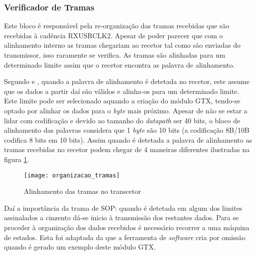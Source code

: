 \subsubsection*{Verificador de Tramas} \label{subsub:serial_frameChecker}
  

Este bloco é responsável pela re-organização das tramas recebidas que são recebidas à cadência RXUSRCLK2. Apesar de poder parecer que com o alinhamento interno as tramas chegariam ao recetor tal como são enviadas do transmissor, isso raramente se verifica. As tramas são alinhadas para um determinado limite assim que o recetor encontra as palavra de alinhamento. %

Segundo \cite{R022} e \cite{R011}, quando a palavra de alinhamento é detetada no recetor, este assume que os dados a partir daí são válidos e alinha-os para um determinado limite. Este limite pode ser selecionado aquando a criação do módulo GTX, tendo-se optado por alinhar os dados para o \textit{byte} mais próximo. Apesar de não se estar a lidar com codificação e devido ao tamanho do \textit{datapath} ser 40 bits, o bloco de alinhamento das palavras considera que 1 \textit{byte} são 10 bits (a codificação 8B/10B codifica 8 bits em 10 bits). Assim quando é detetada a palavra de alinhamento as tramas recebidas no recetor podem chegar de 4 maneiras diferentes ilustradas na figura \ref{fig:alinhamento_tramas_gtx}.


\begin{figure}[h!]
		\begin{center}
		\leavevmode
		\texttt{[image: organizacao\_tramas]}
		\captionsetup{width=1.0\linewidth}
		\caption[Alinhamento das tramas no transcetor]{Alinhamento das tramas no transcetor}
		\label{fig:alinhamento_tramas_gtx}
	\end{center}
\end{figure}

Daí a importância da trama de SOP: quando é detetada em algum dos limites assinalados a cinzento dá-se inicio à transmissão dos restantes dados. Para se proceder à organização dos dados recebidos é necessário recorrer a uma máquina de estados. Esta foi adaptada da que a ferramenta de \textit{software} cria por omissão quando é gerado um exemplo deste módulo GTX.

